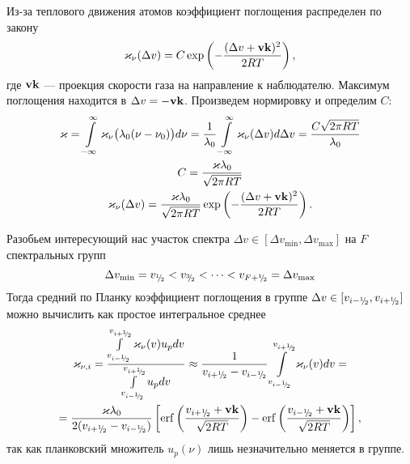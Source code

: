 Из-за теплового движения атомов коэффициент поглощения распределен по закону
\[
\varkappa_\nu(\Delta v) = C\exp\left(-\frac{(\Delta v + \boldsymbol{\mathbf{v}}\boldsymbol{\mathbf{k}})^2}{2RT}\right),
\]
где $\boldsymbol{\mathbf{v}}\boldsymbol{\mathbf{k}}$ --- проекция скорости газа на направление к наблюдателю. Максимум поглощения находится в $\Delta v = -\boldsymbol{\mathbf{v}}\boldsymbol{\mathbf{k}}$.
Произведем нормировку и определим $C$:
\begin{gather*}
\varkappa = \int\limits_{-\infty}^\infty \varkappa_\nu\big(\lambda_0(\nu - \nu_0)\big) d\nu = 
\frac{1}{\lambda_0} \int\limits_{-\infty}^\infty \varkappa_\nu(\Delta v) d\Delta v = 
\frac{C\sqrt{2\pi RT}}{\lambda_0}\\
C = \frac{\varkappa \lambda_0}{\sqrt{2\pi RT}}\\
\varkappa_\nu(\Delta v) = \frac{\varkappa \lambda_0}{\sqrt{2\pi RT}}\exp\left(-\frac{(\Delta v + \boldsymbol{\mathbf{v}}\boldsymbol{\mathbf{k}})^2}{2RT}\right).
\end{gather*}

Разобьем интересующий нас участок спектра $\Delta v \in [\Delta v_{\min}, \Delta v_{\max}]$ на $F$ спектральных групп
\[
\Delta v_{\min} = v_{{}^{1}\mkern-5mu/{\!}_{2}} < v_{{}^{3}\mkern-5mu/{\!}_{2}} < \dots < v_{F+{}^{1}\mkern-5mu/{\!}_{2}} = \Delta v_{\max}
\]
Тогда средний по Планку коэффициент поглощения в группе $\Delta v \in [v_{i-{}^{1}\mkern-5mu/{\!}_{2}}, v_{i+{}^{1}\mkern-5mu/{\!}_{2}}]$ можно вычислить как простое интегральное среднее
\begin{multline*}
\varkappa_{\nu,i} = 
\frac{\int\limits_{v_{i-\half}}^{v_{i+\half}} \varkappa_\nu(v) u_p dv}
{\int\limits_{v_{i-\half}}^{v_{i+\half}} u_p dv}
\approx 
\frac{1}{v_{i+\half} - v_{i-\half}}\int\limits_{v_{i-\half}}^{v_{i+\half}} \varkappa_\nu(v) dv
= \\ =
\frac{\varkappa \lambda_0}{2(v_{i+\half} - v_{i-\half})} \left[
\operatorname{erf}\left(\frac{v_{i+\half} + \bvec{v}\bvec{k}}{\sqrt{2RT}}\right)
-
\operatorname{erf}\left(\frac{v_{i-\half} + \bvec{v}\bvec{k}}{\sqrt{2RT}}\right)
\right],
\end{multline*}
так как планковский множитель $u_p(\nu)$ лишь незначительно меняется в группе.